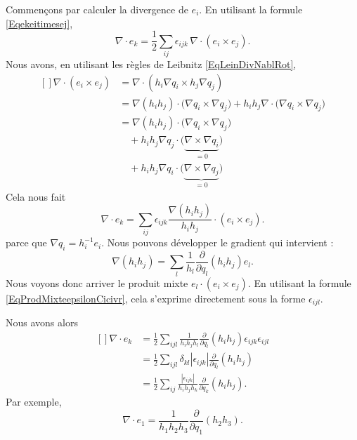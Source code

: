 Commençons par calculer la divergence de $e_i$. En utilisant la formule \eqref{Eqekeitimesej},
\begin{equation}
    \nabla\cdot e_k=\frac{ 1 }{2}\sum_{ij}\epsilon_{ijk}\,\nabla\cdot (e_i\times e_j).
\end{equation}
Nous avons, en utilisant les règles de Leibnitz \eqref{EqLeinDivNablRot},
\begin{equation}
    \begin{aligned}[]
        \nabla\cdot(e_i\times e_j)&=\nabla\cdot(h_i\nabla q_i\times h_j\nabla q_j)\\
        &=\nabla(h_ih_j)\cdot\big( \nabla q_i\times\nabla q_j \big)+h_ih_j\nabla\cdot\big( \nabla q_i\times\nabla q_j \big)\\
        &=\nabla(h_ih_j)\cdot\big( \nabla q_i\times\nabla q_j \big)\\
        &\quad+h_ih_j\nabla q_j\cdot\big( \underbrace{\nabla\times\nabla q_i}_{=0} \big)\\
        &\quad+h_ih_j\nabla q_i\cdot\big( \underbrace{\nabla\times\nabla q_j}_{=0} \big)
    \end{aligned}
\end{equation}
Cela nous fait
\begin{equation}
    \nabla\cdot e_k=\sum_{ij}\epsilon_{ijk}\frac{ \nabla(h_ih_j) }{ h_ih_j }\cdot (e_i\times e_j).
\end{equation}
parce que $\nabla q_i=h_i^{-1}e_i$. Nous pouvons développer le gradient qui intervient :
\begin{equation}
    \nabla(h_ih_j)=\sum_l\frac{1}{ h_l }\frac{ \partial  }{ \partial q_l }(h_ih_j)e_l.
\end{equation}
Nous voyons donc arriver le produit mixte $e_l\cdot (e_i\times e_j)$. En utilisant la formule \eqref{EqProdMixteepsilonCicivr}, cela s'exprime directement sous la forme $\epsilon_{ijl}$.

Nous avons alors
\begin{equation}        \label{EqFragradekdvi}
    \begin{aligned}[]
        \nabla\cdot e_k&=\frac{ 1 }{2}\sum_{ijl}\frac{1}{ h_ih_jh_l }\frac{ \partial  }{ \partial q_l }(h_ih_j)\epsilon_{ijk}\epsilon_{ijl}\\
        &=\frac{ 1 }{2}\sum_{ijl}\delta_{kl}| \epsilon_{ijk} |\frac{ \partial  }{ \partial q_l }(h_ih_j)\\
        &=\frac{ 1 }{2}\sum_{ij}\frac{| \epsilon_{ijk} |}{ h_ih_jh_k }\frac{ \partial  }{ \partial q_k }(h_ih_j).
    \end{aligned}
\end{equation}
Par exemple,
\begin{equation}
    \nabla\cdot e_1=\frac{1}{ h_1h_2h_3 }\frac{ \partial  }{ \partial q_1 }(h_2h_3).
\end{equation}

